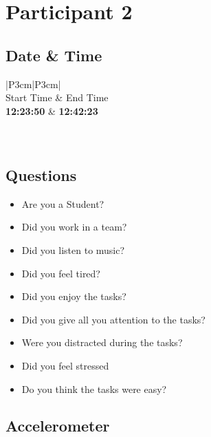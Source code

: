 \section{Participant 2}


\subsection{Date \& Time}
\begin{table}[ht]
  \begin{tabular}{|P{3cm}|P{3cm}|}
	    	\\ \hline
    Start Time      			& End Time   					\\ \hline
   \textbf{12:23:50} 	& \textbf{12:42:23}    	\\ \hline
       						\\ \hline
    			\\ \hline
  \end{tabular}
  \newline\newline
  \caption{P2: Date and Time}\label{dandt2}
\end{table}

\subsection{Questions}
\begin{itemize} 
  \item[\XSolidBrush] Are you a Student?
  \item[\Checkmark] Did you work in a team?
  \item[\Checkmark] Did you listen to music?
  \item[\XSolidBrush] Did you feel tired?
  \item[\Checkmark] Did you enjoy the tasks?
  \item[\Checkmark] Did you give all you attention to the tasks?
  \item[\XSolidBrush] Were you distracted during the tasks?
  \item[\XSolidBrush] Did you feel stressed
  \item[\Checkmark] Do you think the tasks were easy?  
\end{itemize}


\FloatBarrier
\newpage
\subsection{Accelerometer}

